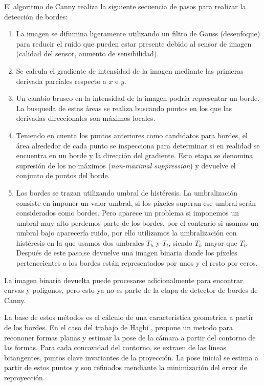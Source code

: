 El algoritmo de Canny realiza la siguiente secuencia de pasos para realizar la detección de bordes: 
\begin{enumerate}
\item La imagen se difumina ligeramente utilizando un filtro de Gauss (desenfoque) para reducir el ruido que pueden estar presente debido al sensor de imagen (calidad del sensor, aumento de sensibilidad). 
\item Se calcula el gradiente de intensidad de la imagen mediante las primeras derivada parciales respecto a $x$ e $y$. 
\item Un cambio brusco en la intensidad de la imagen podría representar un borde. La busqueda de estas áreas se realiza buscando puntos en los que las derivadas direccionales son máximos locales. 
\item Teniendo en cuenta los puntos anteriores como candidatos para bordes, el área alrededor de cada punto se inspecciona para determinar si en realidad se encuentra en un borde y la dirección del gradiente. Esta etapa se denomina supresión de los no máximos (\emph{non-maximal suppression}) y devuelve el conjunto de puntos del borde. 
\item Los bordes se trazan utilizando umbral de histéresis. La umbralización consiste en imponer un valor umbral, si los píxeles superan ese umbral serán considerados como bordes. Pero aparece un problema si imponemos un umbral muy alto perdemos parte de los bordes, por el contrario si usamos un umbral bajo aparecería ruido, por ello utilizamos la umbralización con histéresis en la que usamos dos umbrales $T_{h}$ y $T_{l}$, siendo $T_{h}$ mayor que $T_{l}$. Después de este paso,se devuelve una imagen binaria donde los píxeles pertenecientes a los bordes están representados por unos y el resto por ceros. 
\end{enumerate}

La imagen binaria devuelta puede procesarse adicionalmente para encontrar curvas y polígonos, pero esto ya no es parte de la etapa de detector de bordes de Canny.

La base de estos métodos es el cálculo de una caracteristica geometrica a partir de los bordes. En el caso del trabajo de Hagbi \cite{Hagbi}, propone un metodo para recononer formas planas y estimar la pose de la cámara a partir del contorno de las formas. Para cada concavidad del contorno, se extraen de las líneas bitangentes, puntos clave invariantes de la proyección. La pose inicial se estima a partir de estos puntos y son refinados mendiante la minimización del error de reproyección.

